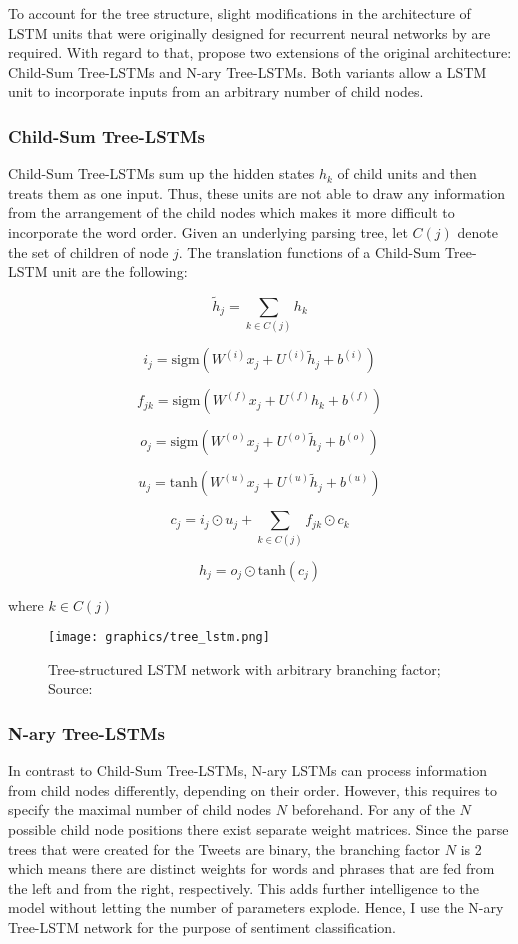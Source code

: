\documentclass[a4paper,12pt]{article}%
\begin{document}
To account for the tree structure, slight modifications in the architecture of LSTM units that were originally designed for recurrent neural networks by \citet{Hochreiter1998} are required. With regard to that, \citet{Tai2015} propose two extensions of the original architecture: Child-Sum Tree-LSTMs and N-ary Tree-LSTMs. Both variants allow a LSTM unit to incorporate inputs from an arbitrary number of child nodes.


\subsubsection{Child-Sum Tree-LSTMs}
Child-Sum Tree-LSTMs sum up the hidden states $h_k$ of child units and then treats them as one input. Thus, these units are not able to draw any information from the arrangement of the child nodes which makes it more difficult to incorporate the word order. Given an underlying parsing tree, let $C(j)$ denote the set of children of node $j$. The translation functions of a Child-Sum Tree-LSTM unit are the following:

$$
\tilde{h}_j = \sum_{k \in C(j)} h_k
$$

$$
i_j = \text{sigm} \left( W^{(i)} x_j + U^{(i)} \tilde{h}_j + b^{(i)} \right) 
$$

$$
f_{jk} = \text{sigm} \left( W^{(f)} x_j + U^{(f)} h_k + b^{(f)} \right) 
$$

$$
o_j = \text{sigm} \left( W^{(o)} x_j + U^{(o)} \tilde{h}_j + b^{(o)} \right) 
$$

$$
u_j = \text{tanh} \left( W^{(u)} x_j + U^{(u)} \tilde{h}_j + b^{(u)} \right) 
$$

$$
c_j = i_j \odot u_j + \sum_{k \in C(j)} f_{jk} \odot c_k
$$

$$
h_j = o_j \odot \text{tanh}(c_j)
$$

where $k \in C(j)$

\begin{figure}
\captionsetup{justification=centering}
\centering
\texttt{[image: graphics/tree\_lstm.png]}
\caption{Tree-structured LSTM network with arbitrary branching factor; Source: \citet{Tai2015} \label{fig:sst}}
\end{figure}


\subsubsection{N-ary Tree-LSTMs}
In contrast to Child-Sum Tree-LSTMs, N-ary LSTMs can process information from child nodes differently, depending on their order. However, this requires to specify the maximal number of child nodes $N$ beforehand. For any of the $N$ possible child node positions there exist separate weight matrices. Since the parse trees that were created for the Tweets are binary, the branching factor $N$ is 2 which means there are distinct weights for words and phrases that are fed from the left and from the right, respectively. This adds further intelligence to the model without letting the number of parameters explode. Hence, I use the N-ary Tree-LSTM network for the purpose of  sentiment classification. 
\end{document}
